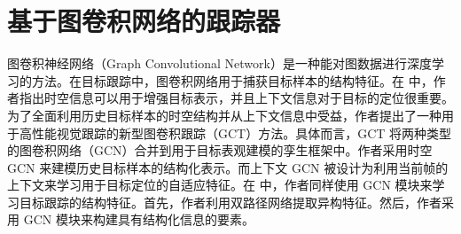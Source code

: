 \section{基于图卷积网络的跟踪器}
图卷积神经网络（Graph Convolutional Network）是一种能对图数据进行深度学习的方法。在目标跟踪中，图卷积网络用于捕获目标样本的结构特征。在 \cite{gao2019graph} 中，作者指出时空信息可以用于增强目标表示，并且上下文信息对于目标的定位很重要。为了全面利用历史目标样本的时空结构并从上下文信息中受益，作者提出了一种用于高性能视觉跟踪的新型图卷积跟踪（GCT）方法。具体而言，GCT 将两种类型的图卷积网络（GCN）合并到用于目标表观建模的孪生框架中。作者采用时空 GCN 来建模历史目标样本的结构化表示。而上下文 GCN 被设计为利用当前帧的上下文来学习用于目标定位的自适应特征。在 \cite{tu2019visual} 中，作者同样使用 GCN 模块来学习目标跟踪的结构特征。首先，作者利用双路径网络提取异构特征。然后，作者采用 GCN 模块来构建具有结构化信息的要素。

